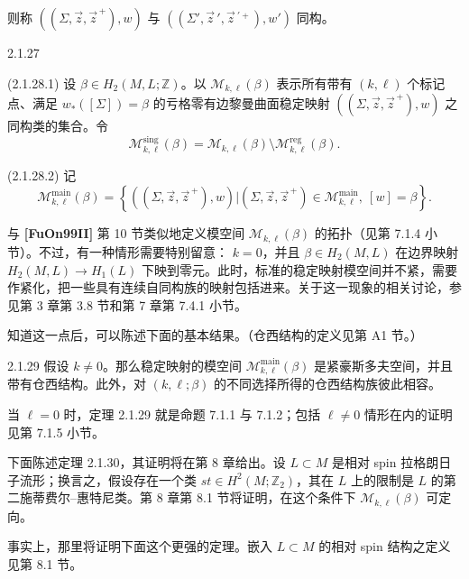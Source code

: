 \noindent 则称
$((\Sigma,\vec z,\vec z^{\,+}),w)$ 与
$((\Sigma',\vec z\,',\vec z\,^{\prime+}),w')$ 同构。

\begin{definition}{2.1.27}\label{def:2-1-27}
\par\smallskip\noindent\textup{(2.1.28.1)}\quad
设 $\beta\in H_2(M,L;\mathbb Z)$。以
$\mathcal M_{k,\ell}(\beta)$ 表示所有带有 $(k,\ell)$ 个标记点、满足
$w_*([\Sigma])=\beta$ 的亏格零有边黎曼曲面稳定映射
$((\Sigma,\vec z,\vec z^{\,+}),w)$ 之同构类的集合。令
\[
  \mathcal M_{k,\ell}^{\mathrm{sing}}(\beta)
  =\mathcal M_{k,\ell}(\beta)
   \setminus\mathcal M_{k,\ell}^{\mathrm{reg}}(\beta).
\]

\par\smallskip\noindent\textup{(2.1.28.2)}\quad
{}
记
\[
  \mathcal M_{k,\ell}^{\mathrm{main}}(\beta)
  =\left\{
    ((\Sigma,\vec z,\vec z^{\,+}),w)
    \mathrel{\Big|}
    (\Sigma,\vec z,\vec z^{\,+})
      \in\mathcal M_{k,\ell}^{\mathrm{main}},\ [w]=\beta
  \right\}.
\]
\end{definition}

与 \textbf{[FuOn99II]} 第 10 节类似地定义模空间
$\mathcal M_{k,\ell}(\beta)$ 的拓扑（见第 7.1.4 小节）。不过，有一种情形需要特别留意：
$k=0$，并且 $\beta\in H_2(M,L)$ 在边界映射
$H_2(M,L)\to H_1(L)$ 下映到零元。此时，标准的稳定映射模空间并不紧，需要作紧化，把一些具有连续自同构族的映射包括进来。关于这一现象的相关讨论，参见第 3 章第 3.8 节和第 7 章第 7.4.1 小节。

知道这一点后，可以陈述下面的基本结果。（仓西结构的定义见第 A1 节。）

\begin{theorem}{2.1.29}\label{thm:2-1-29}
假设 $k\ne0$。那么稳定映射的模空间
$\mathcal M_{k,\ell}^{\mathrm{main}}(\beta)$ 是紧豪斯多夫空间，并且带有仓西结构。此外，对
$(k,\ell;\beta)$ 的不同选择所得的仓西结构族彼此相容。
\end{theorem}

当 $\ell=0$ 时，定理 2.1.29 就是命题 7.1.1 与 7.1.2；包括
$\ell\ne0$ 情形在内的证明见第 7.1.5 小节。

下面陈述定理 2.1.30，其证明将在第 8 章给出。设
$L\subset M$ 是相对 spin 拉格朗日子流形；换言之，假设存在一个类
$st\in H^2(M;\mathbb Z_2)$，其在 $L$ 上的限制是 $L$ 的第二施蒂费尔--惠特尼类。第 8 章第 8.1 节将证明，在这个条件下
$\mathcal M_{k,\ell}(\beta)$ 可定向。

事实上，那里将证明下面这个更强的定理。嵌入 $L\subset M$ 的相对 spin 结构之定义见第 8.1 节。

